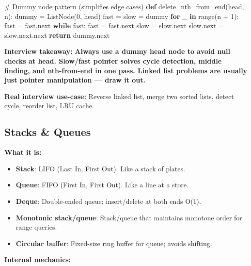 \documentclass[11pt]{article}
\providecommand{\tightlist}{\setlength{\itemsep}{1pt}\setlength{\parskip}{0pt}}
\newenvironment{Shaded}{\begin{snugshade}}{\end{snugshade}}
\newcommand{\BuiltInTok}[1]{\textcolor[rgb]{0.50,0.55,0.55}{#1}}
\newcommand{\CommentTok}[1]{\textcolor[rgb]{0.48,0.49,0.49}{#1}}
\newcommand{\ControlFlowTok}[1]{\textcolor[rgb]{0.99,0.74,0.29}{\textbf{#1}}}
\newcommand{\DecValTok}[1]{\textcolor[rgb]{0.96,0.45,0.00}{#1}}
\newcommand{\KeywordTok}[1]{\textcolor[rgb]{0.81,0.81,0.76}{\textbf{#1}}}
\newcommand{\NormalTok}[1]{\textcolor[rgb]{0.81,0.81,0.76}{#1}}
\newcommand{\OperatorTok}[1]{\textcolor[rgb]{0.81,0.81,0.76}{#1}}
\begin{document}
\begin{Shaded}
\begin{Highlighting}[]
\CommentTok{\# Dummy node pattern (simplifies edge cases)}
\KeywordTok{def}\NormalTok{ delete\_nth\_from\_end(head, n):}
\NormalTok{    dummy }\OperatorTok{=}\NormalTok{ ListNode(}\DecValTok{0}\NormalTok{, head)}
\NormalTok{    fast }\OperatorTok{=}\NormalTok{ slow }\OperatorTok{=}\NormalTok{ dummy}
    \ControlFlowTok{for}\NormalTok{ \_ }\KeywordTok{in} \BuiltInTok{range}\NormalTok{(n }\OperatorTok{+} \DecValTok{1}\NormalTok{):}
\NormalTok{        fast }\OperatorTok{=}\NormalTok{ fast.}\BuiltInTok{next}
    \ControlFlowTok{while}\NormalTok{ fast:}
\NormalTok{        fast }\OperatorTok{=}\NormalTok{ fast.}\BuiltInTok{next}
\NormalTok{        slow }\OperatorTok{=}\NormalTok{ slow.}\BuiltInTok{next}
\NormalTok{    slow.}\BuiltInTok{next} \OperatorTok{=}\NormalTok{ slow.}\BuiltInTok{next}\NormalTok{.}\BuiltInTok{next}
    \ControlFlowTok{return}\NormalTok{ dummy.}\BuiltInTok{next}
\end{Highlighting}
\end{Shaded}

\textbf{Interview takeaway:} \textbf{Always use a dummy head node to avoid null checks at head. Slow/fast pointer solves cycle detection, middle finding, and nth-from-end in one pass. Linked list problems are usually just pointer manipulation --- draw it out.}

\textbf{Real interview use-case:} Reverse linked list, merge two sorted lists, detect cycle, reorder list, LRU cache.

\subsection{Stacks \& Queues}\label{stacks--queues}

\textbf{What it is:}

\begin{itemize}
\tightlist
\item
  \textbf{Stack}: LIFO (Last In, First Out). Like a stack of plates.
\item
  \textbf{Queue}: FIFO (First In, First Out). Like a line at a store.
\item
  \textbf{Deque}: Double-ended queue; insert/delete at both ends O(1).
\item
  \textbf{Monotonic stack/queue}: Stack/queue that maintains monotone order for range queries.
\item
  \textbf{Circular buffer}: Fixed-size ring buffer for queue; avoids shifting.
\end{itemize}

\textbf{Internal mechanics:}
\end{document}
